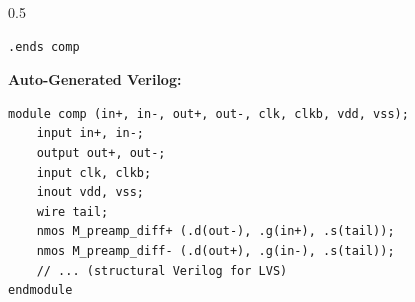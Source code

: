 \begin{frame}[fragile]
\begin{columns}
\begin{column}{0.5\textwidth}
\begin{lstlisting}[basicstyle=\ttfamily\fontsize{3.5}{4.5}\selectfont]
.ends comp
      \end{lstlisting}
      \vspace{0.3em}
      \textbf{Auto-Generated Verilog:}
      \begin{lstlisting}[basicstyle=\ttfamily\fontsize{3.5}{4.5}\selectfont]
module comp (in+, in-, out+, out-, clk, clkb, vdd, vss);
    input in+, in-;
    output out+, out-;
    input clk, clkb;
    inout vdd, vss;
    wire tail;
    nmos M_preamp_diff+ (.d(out-), .g(in+), .s(tail));
    nmos M_preamp_diff- (.d(out+), .g(in-), .s(tail));
    // ... (structural Verilog for LVS)
endmodule
      \end{lstlisting}
    \end{column}
  \end{columns}
\end{frame}


